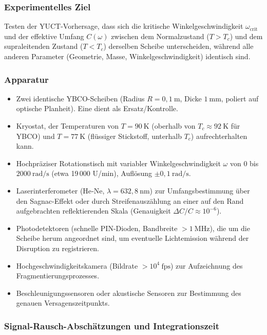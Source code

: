 \documentclass[12pt,a4paper]{article}
\begin{document}
	\subsubsection{Experimentelles Ziel}
	
	Testen der YUCT-Vorhersage, dass sich die kritische Winkelgeschwindigkeit \(\omega_{\text{crit}}\) und der effektive Umfang \(C(\omega)\) zwischen dem Normalzustand (\(T > T_c\)) und dem supraleitenden Zustand (\(T < T_c\)) derselben Scheibe unterscheiden, während alle anderen Parameter (Geometrie, Masse, Winkelgeschwindigkeit) identisch sind.
	
	\subsubsection{Apparatur}
	
	\begin{itemize}
		\item Zwei identische YBCO-Scheiben (Radius \(R = 0,1\ \text{m}\), Dicke \(1\ \text{mm}\), poliert auf optische Planheit). Eine dient als Ersatz/Kontrolle.
		\item Kryostat, der Temperaturen von \(T = 90\ \text{K}\) (oberhalb von \(T_c \approx 92\ \text{K}\) für YBCO) und \(T = 77\ \text{K}\) (flüssiger Stickstoff, unterhalb \(T_c\)) aufrechterhalten kann.
		\item Hochpräziser Rotationstisch mit variabler Winkelgeschwindigkeit \(\omega\) von 0 bis \(2000\ \text{rad/s}\) (etwa 19 000 U/min), Auflösung \(\pm 0,1\ \text{rad/s}\).
		\item Laserinterferometer (He‑Ne, \(\lambda = 632,8\ \text{nm}\)) zur Umfangsbestimmung über den Sagnac-Effekt oder durch Streifenauszählung an einer auf den Rand aufgebrachten reflektierenden Skala (Genauigkeit \(\Delta C/C \approx 10^{-6}\)).
		\item Photodetektoren (schnelle PIN-Dioden, Bandbreite \(> 1\ \text{MHz}\)), die um die Scheibe herum angeordnet sind, um eventuelle Lichtemission während der Disruption zu registrieren.
		\item Hochgeschwindigkeitskamera (Bildrate \(> 10^4\ \text{fps}\)) zur Aufzeichnung des Fragmentierungsprozesses.
		\item Beschleunigungssensoren oder akustische Sensoren zur Bestimmung des genauen Versagenszeitpunkts.
	\end{itemize}
	
	\subsubsection{Signal-Rausch-Abschätzungen und Integrationszeit}
	
\end{document}
